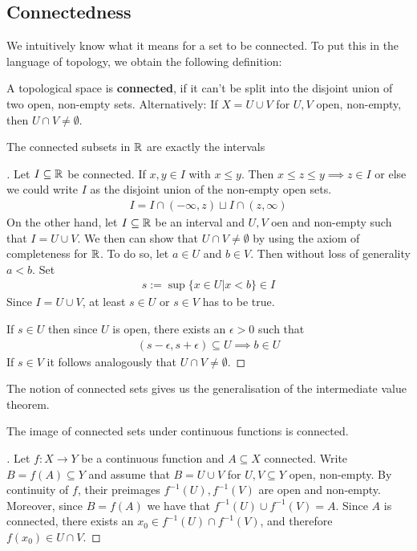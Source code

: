 \subsection{Connectedness}
We intuitively know what it means for a set to be connected. To put this in the language of topology, we obtain the following definition:
\begin{dfn}[]
A topological space is \textbf{connected}, if it can't be split into the disjoint union of two open, non-empty sets.
Alternatively: If $X = U \cup V$ for $U,V$ open, non-empty, then $U \cap V \neq \emptyset$.
\end{dfn}
\begin{lem}[]
The connected subsets in $\mathbb{R}$ are exactly the intervals
\end{lem}
\begin{proof}[]

Let $I \subseteq \mathbb{R}$ be connected. If $x,y \in I$ with $x \leq y$. Then $x \leq z \leq y \implies z \in I$ or else we could write $I$ as the disjoint union of the non-empty open sets.
\begin{align*}
  I = I \cap (-\infty,z) \sqcup I \cap (z,\infty)
\end{align*}
On the other hand, let $I \subseteq \mathbb{R}$ be an interval and $U,V$ oen and non-empty such that $I = U \cup V$. 
We then can show that $U \cap V \neq \emptyset$ by using the axiom of completeness for $\mathbb{R}$.
To do so, let $a \in U$ and $b \in V$. Then without loss of generality $a < b$. Set
\begin{align*}
  s := \sup \{x \in U \big\vert x < b\} \in I
\end{align*}
Since $I = U \cup V$, at least $s \in U$ or $s \in V$ has to be true.

If $s \in U$ then since $U$ is open, there exists an $\epsilon >0$ such that
\begin{align*}
  (s - \epsilon, s + \epsilon) \subseteq U \implies b \in U
\end{align*}
If $s \in V$ it follows analogously that $U \cap V \neq \emptyset$.
\end{proof}


The notion of connected sets gives us the generalisation of the intermediate value theorem.
\begin{thm}[]
  The image of connected sets under continuous functions is connected.
\end{thm}
\begin{proof}[]

Let $f: X \to Y$ be a continuous function and $A \subseteq X$ connected. Write $B = f(A) \subseteq Y$ and assume that $B = U \cup V$ for $U,V \subseteq Y$ open, non-empty. 
By continuity of $f$, their preimages $f^{-1}(U), f^{-1}(V)$ are open and non-empty. 
Moreover, since $B = f(A)$ we have that $f^{-1}(U) \cup f^{-1}(V) = A$. 
Since $A$ is connected, there exists an $x_0 \in f^{-1}(U) \cap f^{-1}(V)$, and therefore $f(x_0) \in U \cap V$.
\end{proof}



